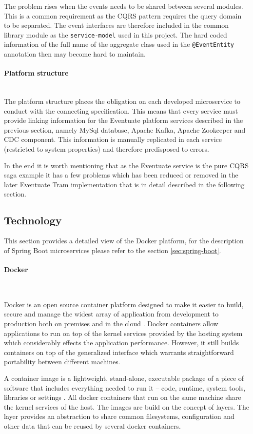 \documentclass[oneside,
  digital, %
  table,   %
  nolof,     %
  nolot,     %
]{fithesis3}
\newcommand{\newlinepar}[1]{\paragraph{#1}\needspace{4\baselineskip}\mbox{}\\}
\begin{document}
The problem rises when the events needs to be shared between several modules. This is a common requirement as the CQRS pattern requires the query domain to be separated. The event interfaces are therefore included in the common library module as the \texttt{service-model} used in this project. The hard coded information of the full name of the aggregate class used in the \texttt{@EventEntity} annotation then may become hard to maintain.

\newlinepar{Platform structure}

The platform structure places the obligation on each developed microservice to conduct with the connecting specification. This means that every service must provide linking information for the Eventuate platform services described in the previous section, namely MySql database, Apache Kafka, Apache Zookeeper and CDC component. This information is manually replicated in each service (restricted to system properties) and therefore predisposed to errors.

\hfill \break

In the end it is worth mentioning that as the Eventuate service is the pure CQRS saga example it has a few problems which has been reduced or removed in the later Eventuate Tram implementation that is in detail described in the following section. 

\subsection{Technology}
\label{sec:eventuate-technology}

This section provides a detailed view of the Docker platform, for the description of Spring Boot microservices please refer to the section \ref{sec:spring-boot}.

\newlinepar{Docker}
\label{sec:docker}

Docker is an open source container platform designed to make it easier to build, secure and manage the widest array of application from development to production both on premises and in the cloud \cite{docker}. Docker containers allow applications to run on top of the kernel services provided by the hosting system which considerably effects the application performance. However, it still builds containers on top of the generalized interface which warrants straightforward portability between different machines.

A container image is a lightweight, stand-alone, executable package of a piece of software that includes everything needed to run it -- code, runtime, system tools, libraries or settings \cite{docker}. All docker containers that run on the same machine share the kernel services of the host. The images are build on the concept of layers. The layer provides an abstraction to share common filesystems, configuration and other data that can be reused by several docker containers.
\end{document}
